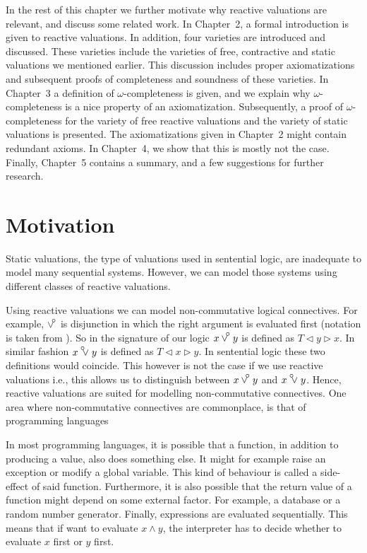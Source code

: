 \documentclass[a4paper,twoside,openright]{report}
\newcommand{\lef}{\ensuremath{\triangleleft}}
\newcommand{\rig}{\ensuremath{\triangleright}}
\newcommand{\leftor}{~
     \mathbin{\setlength{\unitlength}{1ex}
     \begin{picture}(1.4,1.8)(-.3,0)
     \put(-.6,0){$\vee$}
     \put(-.53,1.7){\circle{0.6}}
     \end{picture}
     }}
\newcommand{\rightor}{~
     \mathbin{\setlength{\unitlength}{1ex}
     \begin{picture}(1.4,1.8)
     \put(-.8,0){$\vee$}
     \put(.72,1.7){\circle{0.6}}
     \end{picture}
     }}
\begin{document}
In the rest of this chapter we further motivate why reactive valuations are relevant, and discuss some related work. In Chapter~2, a formal introduction is given to reactive valuations. In addition, four varieties are introduced and discussed. These varieties include the varieties of free, contractive and static valuations we mentioned earlier. This discussion includes proper axiomatizations and subsequent proofs of completeness and soundness of these varieties. In Chapter~3 a definition of $\omega$-completeness is given, and we explain why $\omega$-completeness is a nice property of an axiomatization. Subsequently, a proof of $\omega$-completeness for the variety of free reactive valuations and the variety of static valuations is presented. The axiomatizations given in Chapter~2 might contain redundant axioms. In Chapter~4, we show that this is mostly not the case. Finally, Chapter~5 contains a summary, and a few suggestions for further research.

\section{Motivation}
Static valuations, the type of valuations used in sentential logic, are inadequate to model many sequential systems. However, we can model those systems using different classes of reactive valuations.

Using reactive valuations we can model non-commutative logical connectives. For example, $\rightor$ is disjunction in which the right argument is evaluated first (notation is taken from \cite{connectives}). So in the signature of our logic $x\rightor y$ is defined as $T\lef y\rig x$. In similar fashion $x\leftor y$ is defined as $T\lef x\rig y$. In sentential logic these two definitions would coincide. This however is not the case if we use reactive valuations i.e., this allows us to distinguish between $x\rightor y$ and $x\leftor y$. Hence, reactive valuations are suited for modelling non-commutative connectives. One area where non-commutative connectives are commonplace, is that of programming languages

In most programming languages, it is possible that a function, in addition to producing a value, also does something else. It might for example raise an exception or modify a global variable. This kind of behaviour is called a side-effect of said function. Furthermore, it is also possible that the return value of a function might depend on some external factor. For example, a database or a random number generator. Finally, expressions are evaluated sequentially. This means that if want to evaluate $x\wedge y$, the interpreter has to decide whether to evaluate $x$ first or $y$ first.
\end{document}
